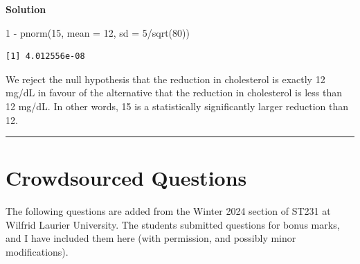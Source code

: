 \documentclass[
  letterpaper,
  DIV=11,
  numbers=noendperiod,
  oneside]{scrreprt}
\newenvironment{Shaded}{\begin{snugshade}}{\end{snugshade}}
\newcommand{\AttributeTok}[1]{\textcolor[rgb]{0.40,0.45,0.13}{#1}}
\newcommand{\DecValTok}[1]{\textcolor[rgb]{0.68,0.00,0.00}{#1}}
\newcommand{\FunctionTok}[1]{\textcolor[rgb]{0.28,0.35,0.67}{#1}}
\newcommand{\NormalTok}[1]{\textcolor[rgb]{0.00,0.23,0.31}{#1}}
\newcommand{\SpecialCharTok}[1]{\textcolor[rgb]{0.37,0.37,0.37}{#1}}
\begin{document}
\textbf{Solution}

\begin{Shaded}
\begin{Highlighting}[]
\DecValTok{1} \SpecialCharTok{{-}} \FunctionTok{pnorm}\NormalTok{(}\DecValTok{15}\NormalTok{, }\AttributeTok{mean =} \DecValTok{12}\NormalTok{, }\AttributeTok{sd =} \DecValTok{5}\SpecialCharTok{/}\FunctionTok{sqrt}\NormalTok{(}\DecValTok{80}\NormalTok{))}
\end{Highlighting}
\end{Shaded}

\begin{verbatim}
[1] 4.012556e-08
\end{verbatim}

We reject the null hypothesis that the reduction in cholesterol is
exactly 12 mg/dL in favour of the alternative that the reduction in
cholesterol is less than 12 mg/dL. In other words, 15 is a statistically
significantly larger reduction than 12.

\begin{center}\rule{0.5\linewidth}{0.5pt}\end{center}

\hypertarget{crowdsourced-questions-7}{%
\section{Crowdsourced Questions}\label{crowdsourced-questions-7}}

The following questions are added from the Winter 2024 section of ST231
at Wilfrid Laurier University. The students submitted questions for
bonus marks, and I have included them here (with permission, and
possibly minor modifications).
\end{document}
